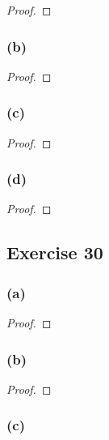\documentclass[14pt]{extarticle}
\begin{document}
\begin{proof}

\end{proof}

\subsubsection{(b)}

\begin{proof}

\end{proof}

\subsubsection{(c)}

\begin{proof}

\end{proof}

\subsubsection{(d)}

\begin{proof}

\end{proof}

\subsection{Exercise 30}

\subsubsection{(a)}

\begin{proof}

\end{proof}

\subsubsection{(b)}

\begin{proof}

\end{proof}

\subsubsection{(c)}
\end{document}
